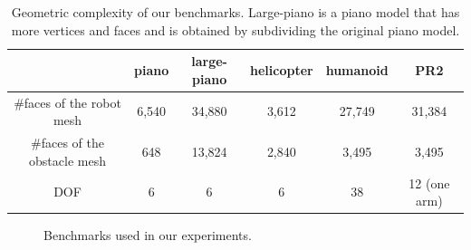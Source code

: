 \begin{table}[!htb]
\begin{center}
\begin{tabular}{|c|c|c|c|c|c|}\hline
&piano & large-piano & helicopter & humanoid & PR2 \\ \hline \hline
\#faces of the robot mesh & 6,540 & 34,880 & 3,612 &  27,749 & 31,384\\ \hline
\#faces of the obstacle mesh & 648 & 13,824 & 2,840 & 3,495 & 3,495\\ \hline
DOF & 6 & 6 & 6 & 38 & 12 (one arm) \\ \hline
\end{tabular}
\caption[Geometric complexity of benchmarks for testing GPU-based collisions]{Geometric complexity of our benchmarks. Large-piano is a piano model that has more vertices and faces and is obtained by subdividing the original piano model.}
\label{tab:5:geom-complexity}
\end{center}
\end{table}

\begin{figure}[!htb]
\centering
    \caption[Benchmarks used for testing GPU-based parallel collisions]{Benchmarks used in our experiments.}
    \label{fig:5:benchmarks}
\end{figure}

